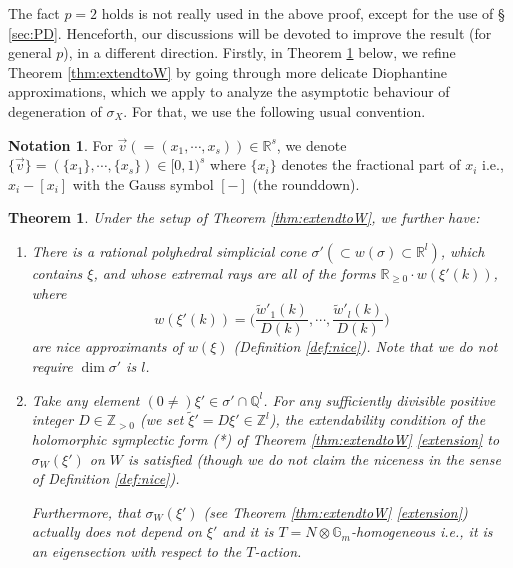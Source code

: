 \documentclass[12pt,a4paper]{amsart}
\newtheorem{Thm}{Theorem}[section]
\theoremstyle{remark}
\theoremstyle{definition}
\newtheorem{ntt}{Notation}
\def\dim{\operatorname{dim}}
\def\R{\mathbb{R}}
\def\G{\mathbb{G}}
\def\Z{\mathbb{Z}}
\def\Q{\mathbb{Q}}
\begin{document}
The fact $p=2$ holds 
is not really used in the above proof, except for the use of \S 
\ref{sec:PD}. 
Henceforth, our discussions will be devoted to improve the 
result (for general $p$), in a different direction. 
Firstly, in Theorem \ref{thm:extendtoW2} below, we refine Theorem \ref{thm:extendtoW} by going through 
more delicate Diophantine approximations, which we apply to 
analyze the asymptotic behaviour of degeneration of $\sigma_X$. 
For that, we use the following usual convention. 
\begin{ntt}\label{ntt4}
For $\vec{v}(=(x_1,\cdots,x_s))\in \R^{s}$, 
we denote $\{\vec{v}\}=(\{x_1\},\cdots,\{x_s\})
\in [0,1)^s$ 
where $\{x_i\}$ denotes the fractional part of $x_i$ i.e., $x_i-[x_i]$ with the Gauss symbol $[-]$ 
(the rounddown).     
\end{ntt}
    \begin{Thm}\label{thm:extendtoW2}
Under the setup of Theorem \ref{thm:extendtoW}, 
we further have: 
\begin{enumerate}[label=(\alph*)]
    \item \label{extension.cone}
    There is a rational polyhedral simplicial 
    cone $\sigma'(\subset w(\sigma)\subset \R^l)$, which contains $\xi$, and whose extremal rays are  
    all of the forms $\R_{\ge 0}\cdot w(\xi'(k))$, where 
    $$w(\xi'(k))=\biggl(\frac{\tilde{w}'_1(k)}{D(k)},\cdots,\frac{\tilde{w}'_l(k)}{D(k)}\biggr)$$ 
    are nice  approximants of $w(\xi)$ (Definition \ref{def:nice}). Note that we do not require 
    $\dim \sigma'$ is $l$. 
    \item \label{canonicity.sigmaW}
    Take any element $(0\neq )\xi' \in \sigma'\cap \Q^l$. For any sufficiently divisible 
    positive integer $D\in \Z_{>0}$ (we set $\tilde{\xi}'=D\xi'\in \Z^l$),  
    the extendability condition of the holomorphic symplectic form 
    (*) of Theorem \ref{thm:extendtoW}   \eqref{extension} 
    to $\sigma_W(\xi')$ on $W$ 
    is satisfied (though we do not claim the niceness in the sense of  
    Definition \ref{def:nice}). 
    
    Furthermore, that $\sigma_W(\xi')$ (see Theorem \ref{thm:extendtoW} \eqref{extension}) actually 
    does not depend on $\xi'$ and it is $T=N\otimes \G_m$-homogeneous i.e., 
    it is an eigensection with respect to the $T$-action. 
    \end{enumerate}
\end{Thm}
\end{document}
